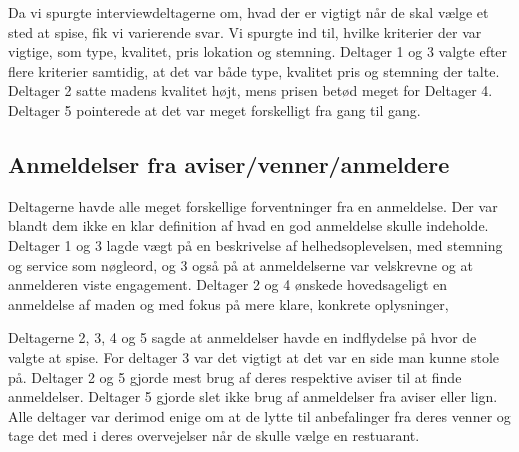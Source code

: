 \documentclass[a4paper, 12pt]{article}
\begin{document}
Da vi spurgte interviewdeltagerne om, hvad der er vigtigt når de skal
vælge et sted at spise, fik vi varierende svar. Vi spurgte ind til,
hvilke kriterier der var vigtige, som type, kvalitet, pris lokation og
stemning. Deltager 1 og 3 valgte efter flere kriterier samtidig, at
det var både type, kvalitet pris og stemning der talte. Deltager 2
satte madens kvalitet højt, mens prisen betød meget for Deltager
4. Deltager 5 pointerede at det var meget forskelligt fra gang til
gang.


\subsection{Anmeldelser fra aviser/venner/anmeldere}

Deltagerne havde alle meget forskellige forventninger fra en anmeldelse. Der var blandt dem ikke en klar definition af hvad en god anmeldelse skulle indeholde. Deltager 1 og 3 lagde vægt på en beskrivelse af helhedsoplevelsen, med stemning og service som nøgleord, og 3 også på at anmeldelserne var velskrevne og at anmelderen viste engagement. Deltager 2 og 4 ønskede hovedsageligt en anmeldelse af maden og med fokus på mere klare, konkrete oplysninger,

Deltagerne 2, 3, 4 og 5 sagde at anmeldelser havde en indflydelse på hvor de valgte at spise. For deltager 3 var det vigtigt at det var en side man kunne stole på. Deltager 2 og 5 gjorde mest brug af deres respektive aviser til at finde anmeldelser. Deltager 5 gjorde slet ikke brug af anmeldelser fra aviser eller lign. Alle deltager var derimod enige om at de lytte til anbefalinger fra deres venner og tage det med i deres overvejelser når de skulle vælge en restuarant.

\end{document}
